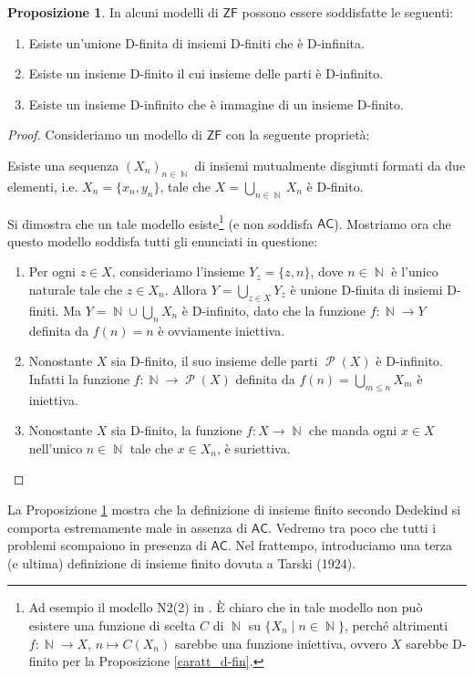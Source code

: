 \documentclass[12pt,a4paper]{report}
\theoremstyle{definition}
\newtheorem{prop}[teo]{Proposizione}  %
\theoremstyle{num.custom-title}
\DeclareMathOperator{\PP}{\mathcal{P}}
\DeclareMathOperator{\N}{\mathbb{N}}
\newcommand{\AC}{\ensuremath{\mathsf{AC}}\xspace}
\newcommand{\ZF}{\ensuremath{\mathsf{ZF}}\xspace}
\begin{document}
\begin{prop}\label{d-fin_bugs}
In alcuni modelli di \ZF possono essere soddisfatte le seguenti:
\begin{enumerate}
\item Esiste un'unione D-finita di insiemi D-finiti che è D-infinita.
\item Esiste un insieme D-finito il cui insieme delle parti è D-infinito.
\item Esiste un insieme D-infinito che è immagine di un insieme D-finito.
\end{enumerate}
\begin{proof}
Consideriamo un modello di \ZF con la seguente proprietà:
\begin{center}
Esiste una sequenza $(X_n)_{n \in \N}$ di insiemi mutualmente disgiunti formati da due elementi, i.e. $X_n=\{x_n,y_n\}$, tale che $X=\bigcup_{n \in \N} X_n$ è D-finito.
\end{center}
Si dimostra che un tale modello esiste\footnote{Ad esempio il modello N2(2) in \cite{HoRu98:Herrlich}. È chiaro che in tale modello non può esistere una funzione di scelta $C$ di $\N$ su $\{X_n \mid n \in \N\}$, perché altrimenti $f: \N \to X$, $n \mapsto C(X_n)$ sarebbe una funzione iniettiva, ovvero $X$ sarebbe D-finito per la Proposizione \ref{caratt_d-fin}.} (e non soddisfa \AC). Mostriamo ora che questo modello soddisfa tutti gli enunciati in questione:
\begin{enumerate}
\item Per ogni $z \in X$, consideriamo l'insieme $Y_z = \{z,n\}$, dove $n \in \N$ è l'unico naturale tale che $z \in X_n$. Allora $Y= \bigcup_{z \in X} Y_z$ è unione D-finita di insiemi D-finiti. Ma $Y = \N \cup \bigcup_n X_n$ è D-infinito, dato che la funzione $f: \N \to Y$ definita da $f(n)=n$ è ovviamente iniettiva.
\item Nonostante $X$ sia D-finito, il suo insieme delle parti $\PP(X)$ è D-infinito. Infatti la funzione $f: \N \to \PP(X)$ definita da $f(n) = \displaystyle\bigcup_{m \leq n} X_m$ è iniettiva.
\item Nonostante $X$ sia D-finito, la funzione $f: X \to \N$ che manda ogni $x \in X$ nell'unico $n \in \N$ tale che $x \in X_n$, è suriettiva.
\end{enumerate}
\end{proof}
\end{prop}

La Proposizione \ref{d-fin_bugs} mostra che la definizione di insieme finito secondo Dedekind si comporta estremamente male in assenza di \AC. Vedremo tra poco che tutti i problemi scompaiono in presenza di \AC. Nel frattempo, introduciamo una terza (e ultima) definizione di insieme finito dovuta a Tarski (1924).
\end{document}

